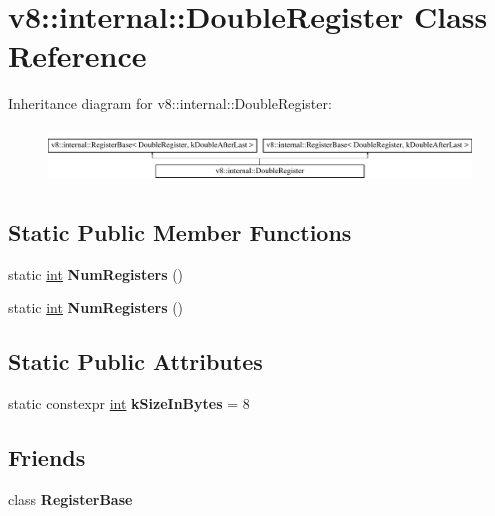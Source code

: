 \hypertarget{classv8_1_1internal_1_1DoubleRegister}{}\section{v8\+:\+:internal\+:\+:Double\+Register Class Reference}
\label{classv8_1_1internal_1_1DoubleRegister}
Inheritance diagram for v8\+:\+:internal\+:\+:Double\+Register\+:\begin{figure}[H]
\begin{center}
\leavevmode
\includegraphics[height=1.481482cm]{classv8_1_1internal_1_1DoubleRegister}
\end{center}
\end{figure}
\subsection*{Static Public Member Functions}
\begin{DoxyCompactItemize}
\item 
\mbox{\label{classv8_1_1internal_1_1DoubleRegister_a473c605dec29cbc4b809c58cc6c0c275}} 
static \mbox{\hyperlink{classint}{int}} {\bfseries Num\+Registers} ()
\item 
\mbox{\label{classv8_1_1internal_1_1DoubleRegister_aca2b5154d072ab12d9fcc732fda7c8fd}} 
static \mbox{\hyperlink{classint}{int}} {\bfseries Num\+Registers} ()
\end{DoxyCompactItemize}
\subsection*{Static Public Attributes}
\begin{DoxyCompactItemize}
\item 
\mbox{\label{classv8_1_1internal_1_1DoubleRegister_a509a7289c03a2a6ba3e096da8a302e18}} 
static constexpr \mbox{\hyperlink{classint}{int}} {\bfseries k\+Size\+In\+Bytes} = 8
\end{DoxyCompactItemize}
\subsection*{Friends}
\begin{DoxyCompactItemize}
\item 
\mbox{\label{classv8_1_1internal_1_1DoubleRegister_a960d84c54d6f69c7f2d3cf54e7fd6938}} 
class {\bfseries Register\+Base}
\end{DoxyCompactItemize}
